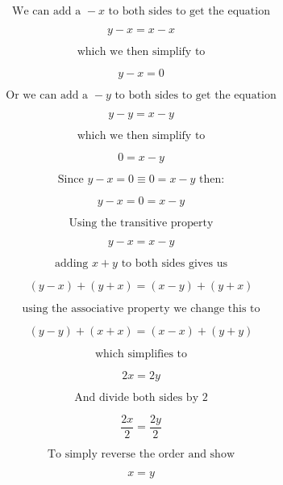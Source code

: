 $$ \text{We can add a } -x \text{ to both sides to get the equation}$$



$$y - x = x - x$$



$$ \text{which we then simplify to}$$



$$y - x = 0$$



$$ \text{Or we can add a } -y \text{ to both sides to get the equation}$$



$$y - y = x - y$$



$$ \text{which we then simplify to}$$



$$0 = x - y$$



$$ \text{Since } y - x = 0  \equiv 0 = x - y \text{ then:}$$



$$y - x = 0 = x - y$$



$$ \text{Using the transitive property}$$



$$y - x  = x - y$$



$$ \text{adding } x + y \text{ to both sides gives us}$$



$$(y - x )+( y + x)  = (x - y) + (y + x)$$



$$ \text{using the associative property we change this to}$$



$$(y - y )+( x + x)  = (x - x) + (y + y)$$



$$ \text{which simplifies to}$$



$$2x  = 2y$$



$$ \text{And divide both sides by } 2$$



$$\frac{2x}{2}  = \frac{2y}{2}$$



$$ \text{To simply reverse the order and show}$$



$$x = y$$



